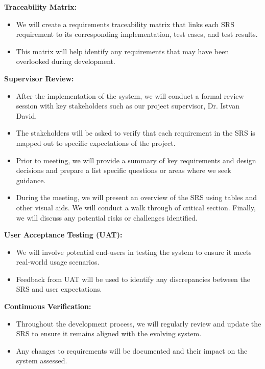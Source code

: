 \documentclass[12pt, titlepage]{article}
\begin{document}
\textbf{Traceability Matrix:}
\begin{itemize}
    \item We will create a requirements traceability matrix that links each SRS requirement to its corresponding implementation, test cases, and test results.
    \item This matrix will help identify any requirements that may have been overlooked during development.
\end{itemize}

\textbf{Supervisor Review:}
\begin{itemize}
    \item After the implementation of the system, we will conduct a formal review session with key stakeholders such as our project supervisor, Dr. Istvan David.
    \item The stakeholders will be asked to verify that each requirement in the SRS is mapped out to specific expectations of the project. 
    \item Prior to meeting, we will provide a summary of key requirements and design decisions and prepare a list specific questions or areas where we seek guidance.
    \item During the meeting, we will present an overview of the SRS using tables and other visual aids. We will conduct a walk through of critical section. Finally, we will discuss any potential risks or challenges identified.
\end{itemize}

\textbf{User Acceptance Testing (UAT):}
\begin{itemize}
    \item We will involve potential end-users in testing the system to ensure it meets real-world usage scenarios.
    \item Feedback from UAT will be used to identify any discrepancies between the SRS and user expectations.
\end{itemize}

\textbf{Continuous Verification:}
\begin{itemize}
    \item Throughout the development process, we will regularly review and update the SRS to ensure it remains aligned with the evolving system.
    \item Any changes to requirements will be documented and their impact on the system assessed.
\end{itemize}
\end{document}
